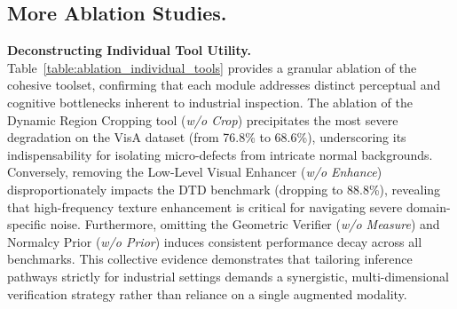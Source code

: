 \documentclass{article}
\begin{document}
{\subsection{More Ablation Studies.}

\begin{table}
\vspace{-1.5em} %
\centering
\caption{Ablation of individual tools.}
\label{table:ablation_individual_tools}
\vspace{-1.0em} %
\end{table}

\textbf{Deconstructing Individual Tool Utility.} Table~\ref{table:ablation_individual_tools} provides a granular ablation of the cohesive toolset, confirming that each module addresses distinct perceptual and cognitive bottlenecks inherent to industrial inspection. The ablation of the Dynamic Region Cropping tool (\emph{w/o Crop}) precipitates the most severe degradation on the VisA dataset (from 76.8\% to 68.6\%), underscoring its indispensability for isolating micro-defects from intricate normal backgrounds. Conversely, removing the Low-Level Visual Enhancer (\emph{w/o Enhance}) disproportionately impacts the DTD benchmark (dropping to 88.8\%), revealing that high-frequency texture enhancement is critical for navigating severe domain-specific noise. Furthermore, omitting the Geometric Verifier (\emph{w/o Measure}) and Normalcy Prior (\emph{w/o Prior}) induces consistent performance decay across all benchmarks. This collective evidence demonstrates that tailoring inference pathways strictly for industrial settings demands a synergistic, multi-dimensional verification strategy rather than reliance on a single augmented modality.

}
\end{document}
